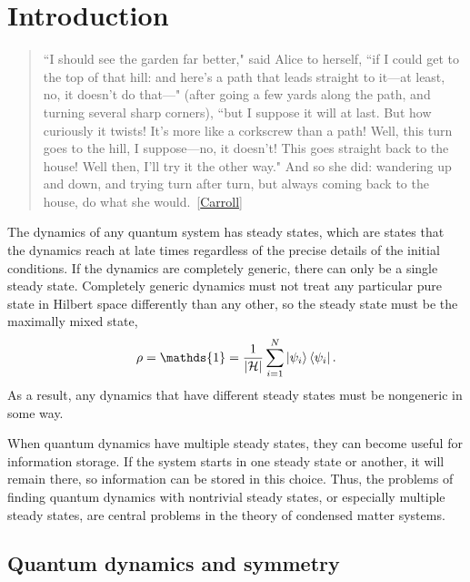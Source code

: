 
\chapter{Introduction}
\label{chp:intro}

\begin{quotation}
	 ``I should see the garden far better," said Alice to herself, ``if I could get to the top of that hill: and here’s a path that leads straight to it—at least, no, it doesn’t do that—" (after going a few yards along the path, and turning several sharp corners), ``but I suppose it will at last. But how curiously it twists! It's more like a corkscrew than a path! Well, this turn goes to the hill, I suppose—no, it doesn't! This goes straight back to the house! Well then, I’ll try it the other way."
	And so she did: wandering up and down, and trying turn after turn, but always coming back to the house, do what she would.~[\hyperlink{cite.\therefsection @Carroll2002Alice}{Carroll}]
\end{quotation}

The dynamics of any quantum system has steady states, which are states that the dynamics reach at late times regardless of the precise details of the initial conditions. If the dynamics are completely generic, there can only be a single steady state. Completely generic dynamics must not treat any particular pure state in Hilbert space differently than any other, so the steady state must be the maximally mixed state,
\begin{align}
\rho = \mathds{1} = \frac{1}{|\mathcal{H}|} \sum_{i=1}^N \ket{\psi_i} \bra{\psi_i}.
\end{align}
As a result, any dynamics that have different steady states must be nongeneric in some way. 

When quantum dynamics have multiple steady states, they can become useful for information storage. If the system starts in one steady state or another, it will remain there, so information can be stored in this choice. Thus, the problems of finding quantum dynamics with nontrivial steady states, or especially multiple steady states, are central problems in the theory of condensed matter systems.

\section{Quantum dynamics and symmetry}

